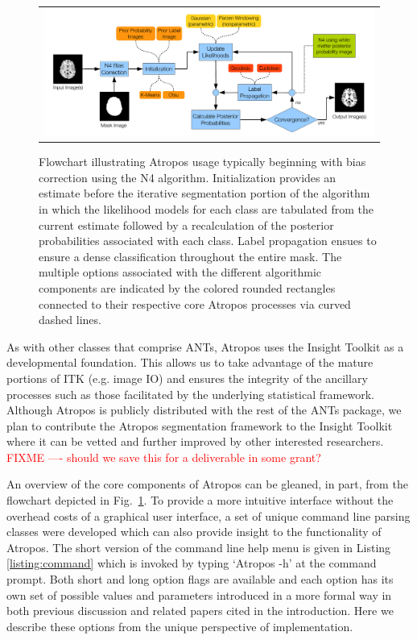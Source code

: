 \documentclass[11pt,english]{article}
\begin{document}
\begin{figure}
\begin{center}
\begin{tabular}{c}
\includegraphics[width=160mm]{AtroposFlowchart.pdf}
\end{tabular}
\caption{\baselineskip 12pt \small Flowchart illustrating Atropos usage typically beginning with bias correction using the N4 algorithm.  
Initialization provides an estimate before the iterative segmentation portion of the algorithm in which the 
likelihood models for each class are tabulated from the current estimate followed by a recalculation of the 
posterior probabilities associated with each class.  Label propagation ensues to ensure a dense 
classification throughout the entire mask.   The multiple options associated with the different algorithmic 
components are indicated by the colored rounded rectangles connected to their respective core Atropos 
processes via curved dashed lines.  }
\label{fig:flowchart}
\end{center}
\end{figure}

As with other classes that comprise ANTs, Atropos uses the Insight Toolkit as a developmental foundation.  
This allows us to take advantage of the mature portions of ITK (e.g. image IO) and ensures the 
integrity of the ancillary processes such as those facilitated by the underlying statistical framework.  Although Atropos is 
publicly distributed with the rest of the ANTs package, we plan to contribute the Atropos segmentation
framework to the Insight Toolkit where it can be vetted and further
improved by other interested researchers. 
{\textcolor{red}{FIXME ---- should we save this for a deliverable in
    some grant?}}

An overview of the core components of Atropos can be gleaned, in part, from the flowchart depicted in 
Fig.~\ref{fig:flowchart}.  To provide a more intuitive interface without the overhead costs of a graphical user interface, a set of unique command line parsing classes were developed which can also provide insight to the functionality of Atropos.  
The short version of the command line help menu is given in Listing \ref{listing:command} which is invoked by typing `{\ttfamily Atropos -h}' at the command prompt.  Both short and long option flags are available and each option has its own set of possible values and parameters introduced in a more formal way in both previous discussion and related papers cited in the introduction.  Here we  describe these options from the unique perspective of  implementation.
\end{document}
